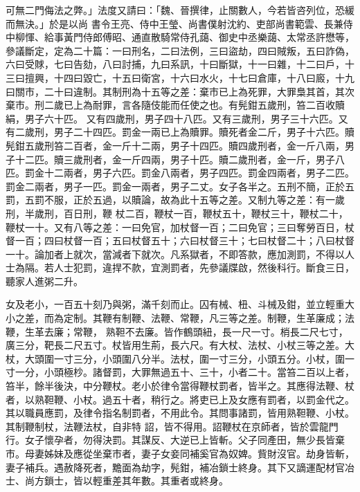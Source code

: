 \begin{pinyinscope}
 可無二門侮法之弊。」法度又請曰：「魏、晉撰律，止關數人，今若皆咨列位，恐緩而無決。」於是以尚
 書令王亮、侍中王瑩、尚書僕射沈約、吏部尚書範雲、長兼侍中柳惲、給事黃門侍郎傅昭、通直散騎常侍孔藹、御史中丞樂藹、太常丞許懋等，參議斷定，定為二十篇：一曰刑名，二曰法例，三曰盜劫，四曰賊叛，五曰詐偽，六曰受賕，七曰告劾，八曰討捕，九曰系訊，十曰斷獄，十一曰雜，十二曰戶，十三曰擅興，十四曰毀亡，十五曰衛宮，十六曰水火，十七曰倉庫，十八曰廄，十九曰關市，二十曰違制。其制刑為十五等之差：棄市已上為死罪，大罪梟其首，其次棄市。刑二歲已上為耐罪，言各隨伎能而任使之也。有髡鉗五歲刑，笞二百收贖絹，男子六十匹。
 又有四歲刑，男子四十八匹。又有三歲刑，男子三十六匹。又有二歲刑，男子二十四匹。罰金一兩已上為贖罪。贖死者金二斤，男子十六匹。贖髡鉗五歲刑笞二百者，金一斤十二兩，男子十四匹。贖四歲刑者，金一斤八兩，男子十二匹。贖三歲刑者，金一斤四兩，男子十匹。贖二歲刑者，金一斤，男子八匹。罰金十二兩者，男子六匹。罰金八兩者，男子四匹。罰金四兩者，男子二匹。罰金二兩者，男子一匹。罰金一兩者，男子二丈。女子各半之。五刑不簡，正於五罰，五罰不服，正於五過，以贖論，故為此十五等之差。又制九等之差：有一歲刑，半歲刑，百日刑，鞭
 杖二百，鞭杖一百，鞭杖五十，鞭杖三十，鞭杖二十，鞭杖一十。又有八等之差：一曰免官，加杖督一百；二曰免官；三曰奪勞百日，杖督一百；四曰杖督一百；五曰杖督五十；六曰杖督三十；七曰杖督二十；八曰杖督一十。論加者上就次，當減者下就次。凡系獄者，不即答款，應加測罰，不得以人士為隔。若人士犯罰，違捍不款，宜測罰者，先參議牒啟，然後科行。斷食三日，聽家人進粥二升。



 女及老小，一百五十刻乃與粥，滿千刻而止。囚有械、杻、斗械及鉗，並立輕重大小之差，而為定制。其鞭有制鞭、法鞭、常鞭，凡三等之差。制鞭，生革廉成；法鞭，生革去廉；常鞭，
 熟靼不去廉。皆作鶴頭紐，長一尺一寸。梢長二尺七寸，廣三分，靶長二尺五寸。杖皆用生荊，長六尺。有大杖、法杖、小杖三等之差。大杖，大頭圍一寸三分，小頭圍八分半。法杖，圍一寸三分，小頭五分。小杖，圍一寸一分，小頭極杪。諸督罰，大罪無過五十、三十，小者二十。當笞二百以上者，笞半，餘半後決，中分鞭杖。老小於律令當得鞭杖罰者，皆半之。其應得法鞭、杖者，以熟靼鞭、小杖。過五十者，稍行之。將吏已上及女應有罰者，以罰金代之。其以職員應罰，及律令指名制罰者，不用此令。其問事諸罰，皆用熟靼鞭、小杖。其制鞭制杖，法鞭法杖，自非特
 詔，皆不得用。詔鞭杖在京師者，皆於雲龍門行。女子懷孕者，勿得決罰。其謀反、大逆已上皆斬。父子同產田，無少長皆棄市。母妻姊妹及應從坐棄市者，妻子女妾同補奚官為奴婢。貲財沒官。劫身皆斬，妻子補兵。遇赦降死者，黵面為劫字，髡鉗，補冶鎖士終身。其下又謫運配材官冶士、尚方鎖士，皆以輕重差其年數。其重者或終身。




\end{pinyinscope}
